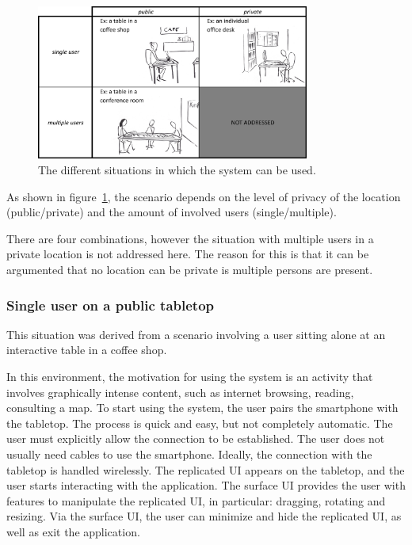 \begin{figure}[htb]
  \centering
    \includegraphics[width=0.8\textwidth]{images/marietable}
    \caption{The different situations in which the system can be used.}
    \label{fig:scenarios}
\end{figure}

As shown in figure~\ref{fig:scenarios}, the scenario depends on the level of privacy of the location (public/private) and the amount of involved users (single/multiple).

There are four combinations, however the situation with multiple users in a private location is not addressed here.
The reason for this is that it can be argumented that no location can be private is multiple persons are present.

\subsubsection{Single user on a public tabletop}

This situation was derived from a scenario involving a user sitting alone at an interactive table in a coffee shop.

In this environment, the motivation for using the system is an activity that involves graphically intense content, such as 
internet browsing, reading, consulting a map.
To start using the system, the user pairs the smartphone with the tabletop.
The process is quick and easy, but not completely automatic.
The user must explicitly allow the connection to be established.
The user does not usually need cables to use the smartphone.
Ideally, the connection with the tabletop is handled wirelessly.
The replicated UI appears on the tabletop, and the user starts interacting with the application.
The surface UI provides the user with features to manipulate the replicated UI, in particular: dragging, rotating and resizing.
Via the surface UI, the user can minimize and hide the replicated UI, as well as exit the application.

